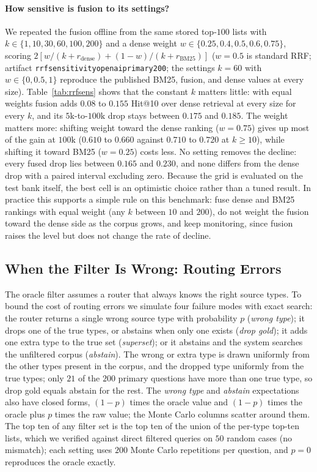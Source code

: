 \documentclass{ieeeaccess}
\makeatletter
\DeclareRobustCommand{\_}{\ifmmode\nfss@text{\textunderscore}\else\textunderscore\allowbreak\fi}
\makeatother
\begin{document}
\paragraph{How sensitive is fusion to its settings?}
We repeated the fusion offline from the same stored top-$100$ lists with $k\in\{1,10,30,60,100,200\}$ and a dense weight $w\in\{0.25,0.4,0.5,0.6,0.75\}$, scoring $2[w/(k+r_{\mathrm{dense}})+(1-w)/(k+r_{\mathrm{BM25}})]$ ($w{=}0.5$ is standard RRF; artifact \texttt{rrf\_sensitivity\_openai\_primary200}; the settings $k{=}60$ with $w\in\{0,0.5,1\}$ reproduce the published BM25, fusion, and dense values at every size). Table~\ref{tab:rrfsens} shows that the constant $k$ matters little: with equal weights fusion adds $0.08$ to $0.155$ Hit@10 over dense retrieval at every size for every $k$, and its $5\text{k}$-to-$100\text{k}$ drop stays between $0.175$ and $0.185$. The weight matters more: shifting weight toward the dense ranking ($w{=}0.75$) gives up most of the gain at $100\text{k}$ ($0.610$ to $0.660$ against $0.710$ to $0.720$ at $k{\ge}10$), while shifting it toward BM25 ($w{=}0.25$) costs less. No setting removes the decline: every fused drop lies between $0.165$ and $0.230$, and none differs from the dense drop with a paired interval excluding zero. Because the grid is evaluated on the test bank itself, the best cell is an optimistic choice rather than a tuned result. In practice this supports a simple rule on this benchmark: fuse dense and BM25 rankings with equal weight (any $k$ between $10$ and $200$), do not weight the fusion toward the dense side as the corpus grows, and keep monitoring, since fusion raises the level but does not change the rate of decline.





\subsection{When the Filter Is Wrong: Routing Errors}
\label{sec:routing}
The oracle filter assumes a router that always knows the right source types. To bound the cost of routing errors we simulate four failure modes with exact search: the router returns a single wrong source type with probability $p$ (\emph{wrong type}); it drops one of the true types, or abstains when only one exists (\emph{drop gold}); it adds one extra type to the true set (\emph{superset}); or it abstains and the system searches the unfiltered corpus (\emph{abstain}). The wrong or extra type is drawn uniformly from the other types present in the corpus, and the dropped type uniformly from the true types; only $21$ of the $200$ primary questions have more than one true type, so drop gold equals abstain for the rest. The \emph{wrong type} and \emph{abstain} expectations also have closed forms, $(1-p)$ times the oracle value and $(1-p)$ times the oracle plus $p$ times the raw value; the Monte Carlo columns scatter around them. The top ten of any filter set is the top ten of the union of the per-type top-ten lists, which we verified against direct filtered queries on $50$ random cases (no mismatch); each setting uses $200$ Monte Carlo repetitions per question, and $p{=}0$ reproduces the oracle exactly.
\end{document}
